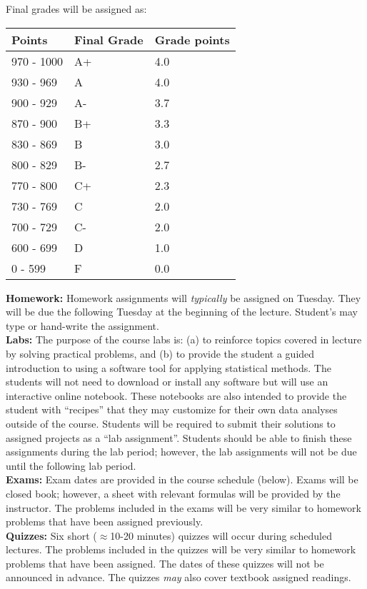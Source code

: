 \documentclass{article}
\begin{document}
Final grades will be assigned as:
\begin{center}
	\begin{tabular}{p{2cm}p{2.5cm}p{2.5cm}}
		\textbf{Points} & \textbf{Final Grade} & \textbf{Grade points}\\ \hline
		970 - 1000 & A+ & 4.0\\
		930 - 969 & A  & 4.0\\
		900 - 929 & A-  & 3.7\\
		870 - 900 & B+  & 3.3\\
		830 - 869 & B  & 3.0\\
		800 - 829 & B- & 2.7\\
		770 - 800 & C+ & 2.3\\
		730 - 769 & C  & 2.0\\
		700 - 729 & C- & 2.0\\
		600 - 699 & D  & 1.0\\
		0 - 599 & F & 0.0\\ \hline
	\end{tabular}
\end{center}
\newpage
\noindent\textbf{Homework:} Homework assignments will \emph{typically} be assigned on Tuesday. They will be due the following Tuesday at the beginning of the lecture. Student's may type or hand-write the assignment. \\
\noindent\textbf{Labs:} The purpose of the course labs is: (a) to reinforce topics covered in lecture by solving practical problems, and (b) to provide the student a guided introduction to using a software tool for applying statistical methods. The students will not need to download or install any software but will use an interactive online notebook. These notebooks are also intended to provide the student with ``recipes'' that they may customize for their own data analyses outside of the course. Students will be required to submit their solutions to assigned projects as a ``lab assignment''. Students should be able to finish these assignments during the lab period; however, the lab assignments will not be due until the following lab period.  \\
\noindent\textbf{Exams:} Exam dates are provided in the course schedule (below). Exams will be closed book; however, a sheet with relevant formulas will be provided by the instructor. The problems included in the exams will be very similar to homework problems that have been assigned previously. \\
\noindent\textbf{Quizzes:} Six short ($\approx$10-20 minutes) quizzes will occur during scheduled lectures. The problems included in the quizzes will be very similar to homework problems that have been assigned. The dates of these quizzes will not be announced in advance. The quizzes \emph{may} also cover textbook assigned readings. \\
\end{document}
